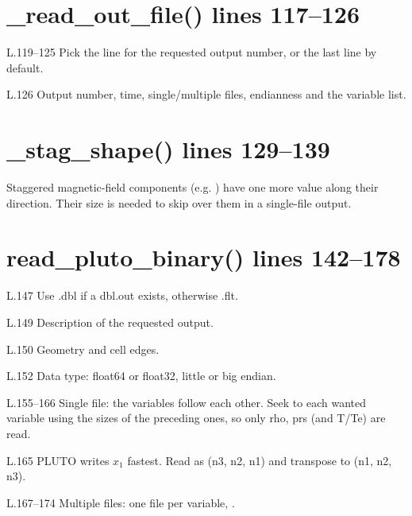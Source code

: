 \section*{\normalsize \_read\_out\_file() \hfill{\small\mdseries\color{gray}lines 117--126}}

\begin{lines}
\item[L.119–125] Pick the line for the requested output number, or the last line by default.
\item[L.126] Output number, time, single/multiple files, endianness and the variable list.
\end{lines}
\section*{\normalsize \_stag\_shape() \hfill{\small\mdseries\color{gray}lines 129--139}}

Staggered magnetic-field components (e.g. ) have one more value along their direction. Their size is needed to skip over them in a single-file output.

\section*{\normalsize read\_pluto\_binary() \hfill{\small\mdseries\color{gray}lines 142--178}}

\begin{lines}
\item[L.147] Use .dbl if a dbl.out exists, otherwise .flt.
\item[L.149] Description of the requested output.
\item[L.150] Geometry and cell edges.
\item[L.152] Data type: float64 or float32, little or big endian.
\item[L.155–166] Single file: the variables follow each other. Seek to each wanted variable using the sizes of the preceding ones, so only rho, prs (and T/Te) are read.
\item[L.165] PLUTO writes $x_1$ fastest. Read as (n3, n2, n1) and transpose to (n1, n2, n3).
\item[L.167–174] Multiple files: one file per variable, .
\end{lines}
